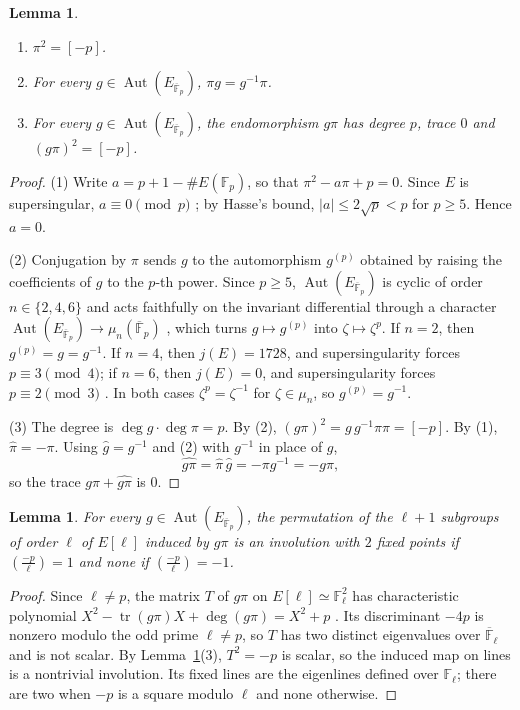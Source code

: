 \documentclass[11pt,a4paper]{article}
\newtheorem{lemma}[theorem]{Lemma}
\theoremstyle{remark}\newtheorem{remark}[theorem]{Remark}
\numberwithin{equation}{section}
\newcommand{\Fp}{\mathbb F_p}
\newcommand{\Fl}{\mathbb F_\ell}
\newcommand{\kk}{\overline{\mathbb F}_p}
\newcommand{\Aut}{\operatorname{Aut}}
\newcommand{\leg}[2]{\left(\frac{#1}{#2}\right)}
\begin{document}
\begin{lemma}\label{lem:frob}
\begin{enumerate}
\item $\pi^2=[-p]$.
\item For every $g\in\Aut(E_{\kk})$, $\pi g=g^{-1}\pi$.
\item For every $g\in\Aut(E_{\kk})$, the endomorphism $g\pi$ has degree $p$, trace $0$ and $(g\pi)^2=[-p]$.
\end{enumerate}
\end{lemma}
\begin{proof}
(1) Write $a=p+1-\#E(\Fp)$, so that $\pi^2-a\pi+p=0$. Since $E$ is supersingular, $a\equiv0\pmod p$ \cite[Ch.~V]{Sil}; by Hasse's bound, $|a|\leq2\sqrt p<p$ for $p\geq5$. Hence $a=0$.

(2) Conjugation by $\pi$ sends $g$ to the automorphism $g^{(p)}$ obtained by raising the coefficients of $g$ to the $p$-th power. Since $p\geq5$, $\Aut(E_{\kk})$ is cyclic of order $n\in\{2,4,6\}$ and acts faithfully on the invariant differential through a character $\Aut(E_{\kk})\to\mu_n(\kk)$ \cite[III.10]{Sil}, which turns $g\mapsto g^{(p)}$ into $\zeta\mapsto\zeta^p$. If $n=2$, then $g^{(p)}=g=g^{-1}$. If $n=4$, then $j(E)=1728$, and supersingularity forces $p\equiv3\pmod4$; if $n=6$, then $j(E)=0$, and supersingularity forces $p\equiv2\pmod3$ \cite[V.4]{Sil}. In both cases $\zeta^p=\zeta^{-1}$ for $\zeta\in\mu_n$, so $g^{(p)}=g^{-1}$.

(3) The degree is $\deg g\cdot\deg\pi=p$. By (2), $(g\pi)^2=g\,g^{-1}\pi\pi=[-p]$. By (1), $\widehat\pi=-\pi$. Using $\widehat g=g^{-1}$ and (2) with $g^{-1}$ in place of $g$,
\[
\widehat{g\pi}=\widehat\pi\,\widehat g=-\pi g^{-1}=-g\pi,
\]
so the trace $g\pi+\widehat{g\pi}$ is $0$.
\end{proof}

\begin{lemma}\label{lem:torsion}
For every $g\in\Aut(E_{\kk})$, the permutation of the $\ell+1$ subgroups of order $\ell$ of $E[\ell]$ induced by $g\pi$ is an involution with $2$ fixed points if $\leg{-p}{\ell}=1$ and none if $\leg{-p}{\ell}=-1$.
\end{lemma}
\begin{proof}
Since $\ell\neq p$, the matrix $T$ of $g\pi$ on $E[\ell]\simeq\Fl^2$ has characteristic polynomial $X^2-\operatorname{tr}(g\pi)X+\deg(g\pi)=X^2+p$ \cite[III.8.6]{Sil}. Its discriminant $-4p$ is nonzero modulo the odd prime $\ell\neq p$, so $T$ has two distinct eigenvalues over $\overline{\mathbb F}_\ell$ and is not scalar. By Lemma~\ref{lem:frob}(3), $T^2=-p$ is scalar, so the induced map on lines is a nontrivial involution. Its fixed lines are the eigenlines defined over $\Fl$; there are two when $-p$ is a square modulo $\ell$ and none otherwise.
\end{proof}
\end{document}
